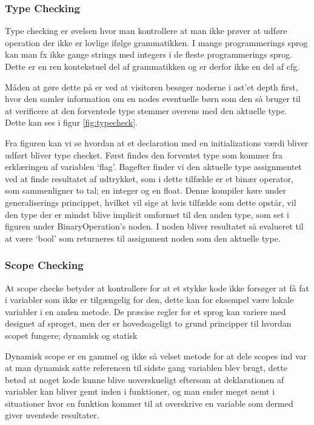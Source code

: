 \subsubsection{Type Checking}
    
    Type checking er øvelsen hvor man kontrollere at man ikke prøver at udføre operation der ikke er lovlige ifølge grammatikken. I mange programmerings sprog kan man fx ikke gange strings med integers i de fleste programmerings sprog. Dette er en ren kontekstuel del af grammatikken og er derfor ikke en del af \gls{cfg}.
    
    Måden at gøre dette på er ved at visitoren besøger noderne i \gls{ast}'et depth first, hvor den samler information om en nodes eventuelle børn som den så bruger til at verificere at den forventede type stemmer overens med den aktuelle type. Dette kan ses i figur \ref{fig:typecheck}.
    
    
\noindent Fra figuren kan vi se hvordan at et declaration med en initializations værdi bliver udført bliver type checket. Først findes den forventet type som kommer fra erklæringen af variablen \enquote*{flag}. Bagefter finder vi den aktuelle type assignmentet ved at finde resultatet af udtrykket, som i dette tilfælde er et binær operator, som sammenligner to tal; en integer og en float. Denne kompiler køre under generaliserings princippet, hvilket vil sige at hvis tilfælde som dette opstår, vil den type der er mindst blive implicit omformet til den anden type, som set i figuren under BinaryOperation's noden. I noden bliver resultatet så evalueret til at være \enquote*{bool} som returneres til assignment noden som den aktuelle type.
    
\subsubsection{Scope Checking}

At scope checke betyder at kontrollere for at et stykke kode ikke forsøger at få fat i variabler som ikke er tilgængelig for den, dette kan for eksempel være lokale variabler i en anden metode. De præcise regler for et sprog kan variere med designet af sproget, men der er hovedsageligt to grund principper til hvordan scopet fungere; dynamisk og statisk
    
Dynamisk scope er en gammel og ikke så velset metode for at dele scopes ind var at man dynamisk satte referencen til sidste gang variablen blev brugt, dette betød at noget kode kunne blive uoverskueligt eftersom at deklarationen af variabler kan bliver gemt inden i funktioner, og man ender meget nemt i situationer hvor en funktion kommer til at overskrive en variable som dermed giver uventede resultater. 
    
